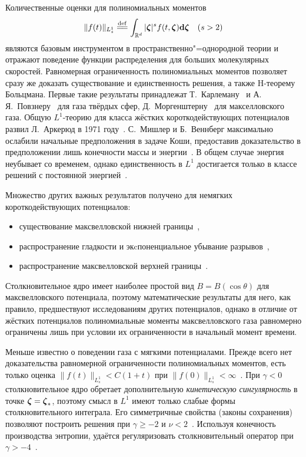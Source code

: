Количественные оценки для полиномиальных моментов
\begin{equation*}
    \|f(t)\|_{L^1_s} \eqdef \int_{\mathbb{R}^d} |\bzeta|^s f(t,\bzeta)\dzeta \quad (s>2)
\end{equation*}
являются базовым инструментом в пространственно"=однородной теории
и отражают поведение функции распределения для больших молекулярных скоростей.
Равномерная ограниченность полиномиальных моментов позволяет сразу же доказать
существование и единственность решения, а также H-теорему Больцмана.
Первые такие результаты принадлежат Т.~Карлеману~\cite{Carleman1933} и А.\,Я.~Повзнеру~\cite{Povzner1962}
для газа твёрдых сфер, Д.~Моргенштерну~\cite{Morgenstern1954} для макселловского газа.
Общую \(L^1\)-теорию для класса жёстких короткодействующих потенциалов развил Л.~Аркерюд в 1971 году~\cite{Arkeryd1972}.
С.~Мишлер и Б.~Веннберг максимально ослабили начальные предположения в задаче Коши,
предоставив доказательство в предположении лишь конечности массы и энергии~\cite{Mischler1999}.
В общем случае энергия неубывает со временем, однако единственность в \(L^1\) достигается
только в классе решений с постоянной энергией~\cite{Wennberg1999}.

Множество других важных результатов получено для немягких короткодействующих потенциалов:
\begin{itemize}
    \item существование максвелловской нижней границы~\cite{Pulvirenti1996, Pulvirenti1997},
    \item распространение гладкости и экcпоненциальное убывание разрывов~\cite{Carlen1999, Mouhot2004},
    \item распространение максвелловской верхней границы~\cite{Gamba2009upper, Bobylev2017}.
\end{itemize}
Столкновительное ядро имеет наиболее простой вид \(B = B(\cos\theta)\) для максвелловского потенциала,
поэтому математические результаты для него, как правило, предшествуют исследованиям других потенциалов,
однако в отличие от жёстких потенциалов полиномиальные моменты максвелловского газа равномерно ограничены лишь
при условии их ограниченности в начальный момент времени.

Меньше известно о поведении газа с мягкими потенциалами.
Прежде всего нет доказательства равномерной ограниченности полиномиальных моментов,
есть только оценка \(\|f(t)\|_{L^1_s} < C(1+t)\) при \(\|f(0)\|_{L^1_s} < \infty\)~\cite{Carlen2009}.
При \(\gamma<0\) столкновительное ядро обретает дополнительную \emph{кинетическую сингулярность} в точке \({\boldsymbol{\zeta}} = {\boldsymbol{\zeta}}_*\),
поэтому смысл в \(L^1\) имеют только слабые формы столкновительного интеграла.
Его симметричные свойства (законы сохранения) позволяют построить решения при \(\gamma\geq-2\) и \(\nu<2\)~\cite{Arkeryd1981, Goudon1997}.
Используя конечность производства энтропии, удаётся регуляризовать столкновительный оператор при \(\gamma>-4\)~\cite{Villani1998}.

